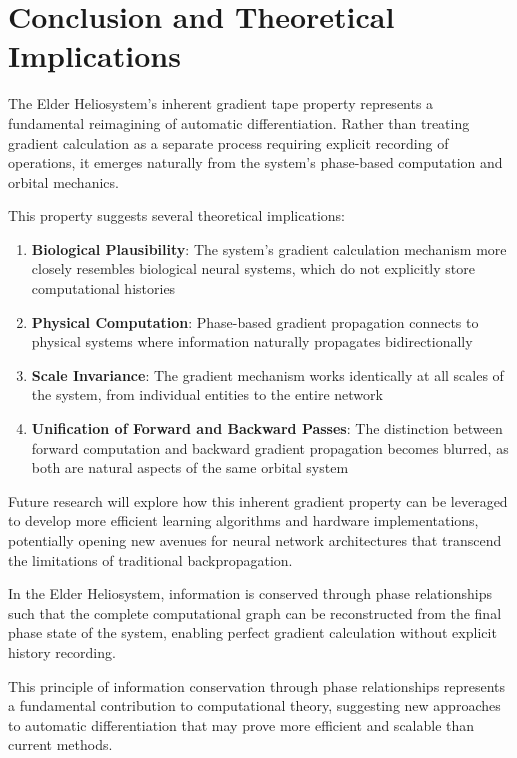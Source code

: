\section{Conclusion and Theoretical Implications}

The Elder Heliosystem's inherent gradient tape property represents a fundamental reimagining of automatic differentiation. Rather than treating gradient calculation as a separate process requiring explicit recording of operations, it emerges naturally from the system's phase-based computation and orbital mechanics.

This property suggests several theoretical implications:

\begin{enumerate}
    \item \textbf{Biological Plausibility}: The system's gradient calculation mechanism more closely resembles biological neural systems, which do not explicitly store computational histories
    \item \textbf{Physical Computation}: Phase-based gradient propagation connects to physical systems where information naturally propagates bidirectionally
    \item \textbf{Scale Invariance}: The gradient mechanism works identically at all scales of the system, from individual entities to the entire network
    \item \textbf{Unification of Forward and Backward Passes}: The distinction between forward computation and backward gradient propagation becomes blurred, as both are natural aspects of the same orbital system
\end{enumerate}

Future research will explore how this inherent gradient property can be leveraged to develop more efficient learning algorithms and hardware implementations, potentially opening new avenues for neural network architectures that transcend the limitations of traditional backpropagation.

\begin{theorem}
In the Elder Heliosystem, information is conserved through phase relationships such that the complete computational graph can be reconstructed from the final phase state of the system, enabling perfect gradient calculation without explicit history recording.
\end{theorem}

This principle of information conservation through phase relationships represents a fundamental contribution to computational theory, suggesting new approaches to automatic differentiation that may prove more efficient and scalable than current methods.